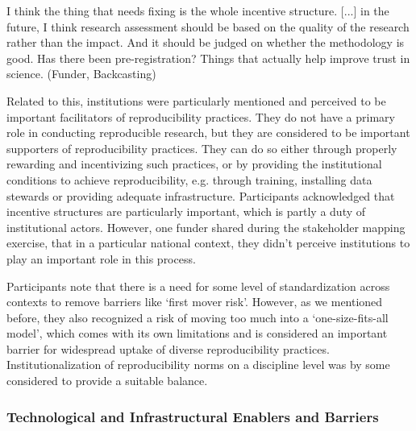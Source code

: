 \documentclass[authordate, meta]{jote-new-article}
\begin{document}
	I think the thing that needs fixing is the whole incentive structure. [...] in the future, I think research assessment should be based on the quality of the research rather than the impact. And it should be judged on whether the methodology is good. Has there been pre-registration? Things that actually help improve trust in science. (Funder, Backcasting)







	Related to this, institutions were particularly mentioned and perceived to be important facilitators of reproducibility practices. They do not have a primary role in conducting reproducible research, but they are considered to be important supporters of reproducibility practices. They can do so either through properly rewarding and incentivizing such practices, or by providing the institutional conditions to achieve reproducibility, e.g. through training, installing data stewards or providing adequate infrastructure. Participants acknowledged that incentive structures are particularly important, which is partly a duty of institutional actors. However, one funder shared during the stakeholder mapping exercise, that in a particular national context, they didn't perceive institutions to play an important role in this process.







	Participants note that there is a need for some level of standardization across contexts to remove barriers like ‘first mover risk'. However, as we mentioned before, they also recognized a risk of moving too much into a ‘one-size-fits-all model', which comes with its own limitations and is considered an important barrier for widespread uptake of diverse reproducibility practices. Institutionalization of reproducibility norms on a discipline level was by some considered to provide a suitable balance. 







	\subsubsection{Technological and Infrastructural Enablers and Barriers}
\end{document}
